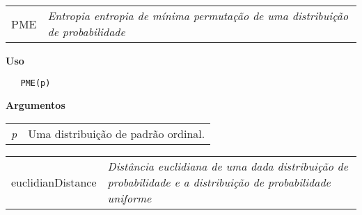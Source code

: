 
\hrulefill   

\begin{table}[!ht]
\begin{center}
\begin{tabularx}{\textwidth}{ X X}
\hspace{0.5cm} PME & \textit{Entropia entropia de mínima permutação de uma distribuição de probabilidade}\\
\end{tabularx}
\end{center}
\end{table} 

\vspace{-0.5cm}

\hrulefill  

\vspace{0.5cm}

\textbf{Uso}

\begin{lstlisting}
   PME(p)
\end{lstlisting}

\vspace{0.5cm}

\textbf{Argumentos}

\begin{table}[!ht]
\begin{center}
\begin{tabularx}{\textwidth}{X X}
\hspace{0.5cm} \textit{p} & Uma distribuição de padrão ordinal.\\
\end{tabularx}
\end{center}
\end{table} 
\newpage

\hrulefill   

\begin{table}[!ht]
\begin{center}
\begin{tabularx}{\textwidth}{ X X}
\hspace{0.5cm} euclidianDistance & \textit{Distância euclidiana de uma dada distribuição de probabilidade e a distribuição de probabilidade uniforme}\\
\end{tabularx}
\end{center}
\end{table} 

